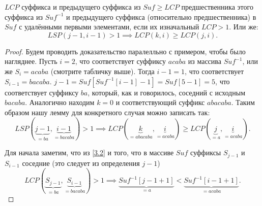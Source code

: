 \begin{enumerate}
                \begin{lemma}
                        \label{3.4}
                        $LCP$ суффикса и предыдущего суффикса из $Suf \geq LCP$ предшественника этого
                        суффикса из $Suf^{-1}$ и предыдущего суффикса (относительно предшественника) в
                        $Suf$ с удалёнными первыми элементами, если их изначальный $LCP > 1$. Или же:
                        \[
                                LSP(j-1, i-1) > 1 \implies LCP(k, i) \geq LCP(j, i) 
                        .\] 
                \end{lemma}
                \begin{proof}
                        Будем проводить доказательство паралелльно с примером, чтобы было нагляднее.
                        Пусть $i = 2$, что соответствует суффиксу $acaba$ из массива $Suf^{-1}$,
                        или же $S_{i} = acaba$ (смотрите табличку выше). Тогда $i - 1 = 1$, что
                        соответствует $S_{i-1} = bacaba$. $j - 1 = Suf[Suf^{-1}[i-1] - 1] = Suf[5 - 1] = 5$,
                        что соответствует суффиксу $ba$, который, как и говорилось, соседний с исходным
                        $bacaba$. Аналогично находим $k = 0$ и соответствующий суффикс  $abacaba$. 
                        Таким образом нашу лемму для конкретного случая можно записать так:
                        \[
                                LSP(\underbrace{j-1}_{=ba}, \underbrace{i-1}_{=bacaba}) > 1 \implies 
                                LCP(\underbrace{k}_{=abacaba}, \underbrace{i}_{=acaba}) 
                                \geq LCP(\underbrace{j}_{=a}, \underbrace{i}_{=acaba}) 
                        .\] 

                        Для начала заметим, что из \ref{3.2} и того, что в массиве $Suf$ суффиксы $S_{j-1}$ 
                        и $S_{i-1}$ соседние (это следует из определения $j-1$)
                        \[
                                LCP(\underbrace{S_{j-1}}_{=ba}, \underbrace{S_{i-1}}_{=bacaba}) > 1 \implies 
                                \underbrace{Suf^{-1}[j - 1 + 1]}_{=a} < 
                                \underbrace{Suf^{-1}[i - 1 + 1]}_{=acaba}
                        .\] 


\end{proof}
\end{enumerate}
